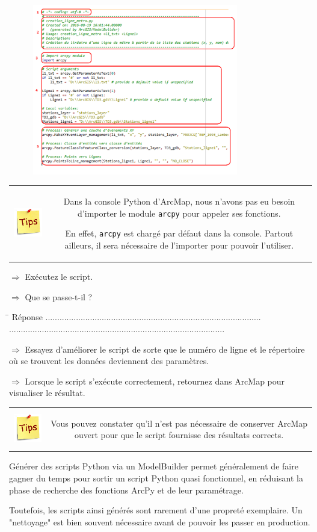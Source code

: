 \documentclass[11pt]{article}
\newcommand{\action}{$\Rightarrow$ }
\newcommand{\reponse}{
	\begin{tabbing}
	\hspace{2cm}\=\kill
	Réponse \> ............................................................................................ \\ 
 	\> ............................................................................................
	\end{tabbing}
}
\newenvironment{note}{%
	\begin{tabular}[t t]{c c}
		\includegraphics{img/tips.png}
		 &
		\begin{minipage}[c]{0.9\linewidth}
			\begin{sffamily}
}{%
			\end{sffamily}
		\end{minipage}
	\end{tabular}	
}
\newcommand{\code}[1]{\lstinline{#1}}
\begin{document}
\begin{figure}[H]
	\center \includegraphics[width=0.8\textwidth]{img/td3/script_arcpy.png}\\
\end{figure}

\begin{note}
Dans la console Python d'ArcMap, nous n'avons pas eu besoin d'importer le module \code{arcpy} pour appeler ses fonctions. 

En effet, \code{arcpy} est chargé par défaut dans la console. Partout ailleurs, il sera nécessaire de l'importer pour pouvoir l'utiliser.
\end{note}

\action	Exécutez le script.

\action Que se passe-t-il ?

\reponse

\action Essayez d'améliorer le script de sorte que le numéro de ligne et le répertoire où se trouvent les données deviennent des paramètres.

\action Lorsque le script s'exécute correctement, retournez dans ArcMap pour visualiser le résultat.

\begin{note}
Vous pouvez constater qu'il n'est pas nécessaire de conserver ArcMap ouvert pour que le script fournisse des résultats corrects.
\end{note}

Générer des scripts Python via un ModelBuilder permet généralement de faire gagner du temps pour sortir un script Python quasi fonctionnel, en réduisant la phase de recherche des fonctions ArcPy et de leur paramétrage.

Toutefois, les scripts ainsi générés sont rarement d'une propreté exemplaire. Un "nettoyage" est bien souvent nécessaire avant de pouvoir les passer en production.
\end{document}
